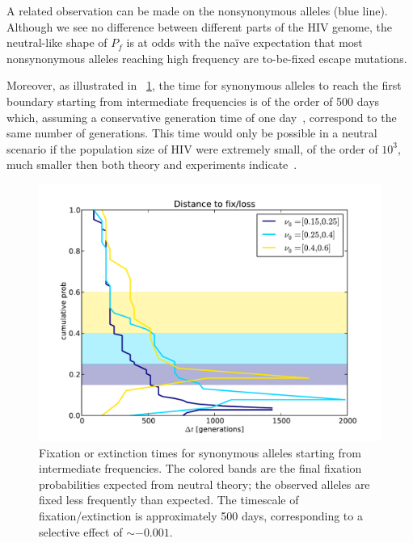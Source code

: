 \documentclass[12pt,a4paper,notitlepage,onecolumn]{article}
\begin{document}
A related observation can be made on the nonsynonymous alleles (blue line).
Although we see no difference between different parts of the HIV genome, the
neutral-like shape of $P_f$ is at odds with the na\"ive expectation that most
nonsynonymous alleles reaching high frequency are to-be-fixed escape mutations.

Moreover, as illustrated in \figurename~\ref{fig:fixtimes}, the time for
synonymous alleles to reach the first boundary starting from intermediate
frequencies is of the order of 500 days which, assuming a conservative
generation time of one day~\citep{perelson_hiv-1_1996}, correspond to the same
number of generations. This time would only be possible in a neutral scenario
if the population size of HIV were extremely small, of the order of $10^3$, much
smaller then both theory and experiments
indicate~\citep{boltz_ultrasensitive_2012}.
\begin{figure}
\begin{center}
\includegraphics[width=\linewidth]{Shankarappa_fix_loss_dt_times}
\caption{Fixation or extinction times for synonymous alleles starting from
intermediate frequencies. The colored bands are the final fixation
probabilities expected from neutral theory; the observed alleles are fixed
less frequently than expected. The timescale of fixation/extinction is
approximately 500 days, corresponding to a selective effect of $\sim -0.001$.}
\label{fig:fixtimes}
\end{center}
\end{figure}
\end{document}
